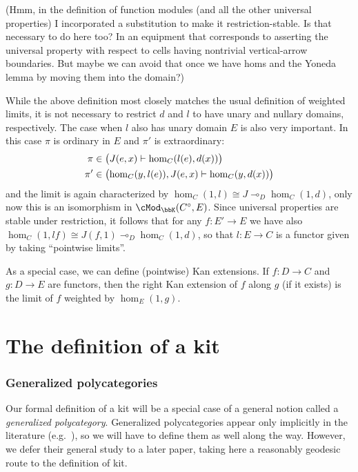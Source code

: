 \documentclass{amsart}
\newcommand{\K}{\bbK}
\let\mod\cMod
\def\modk{\mod_\K}
\def\mor#1{\hom_{#1}}
\renewcommand{\o}{^{\circ}}
\let\mto\vdash    %
\def\mhom#1#2{\left( #1 \vphantom{\big|}\mto #2 \right)}
\begin{document}
(Hmm, in the definition of function modules (and all the other universal properties) I incorporated a substitution to make it restriction-stable.  Is that necessary to do here too?  In an equipment that corresponds to asserting the universal property with respect to cells having nontrivial vertical-arrow boundaries.  But maybe we can avoid that once we have homs and the Yoneda lemma by moving them into the domain?)

While the above definition most closely matches the usual definition of weighted limits, it is not necessary to restrict $d$ and $l$ to have unary and nullary domains, respectively.
The case when $l$ also has unary domain $E$ is also very important.
In this case $\pi$ is ordinary in $E$ and $\pi'$ is extraordinary:
\begin{align*}
\pi &\in \mhom{J(e,x)}{\mor{C}(l(e),d(x))} \\
\pi' &\in \mhom{\mor{C}(y,l(e)),J(e,x)}{\mor{C}(y,d(x))}
\end{align*}
and the limit is again characterized by $\mor{C}(1,l) \cong J \multimap_D \mor{C}(1,d)$, only now this is an isomorphism in $\modk(C\o,E)$.
Since universal properties are stable under restriction, it follows that for any $f:E'\to E$ we have also $\mor{C}(1,l f) \cong J(f,1) \multimap_D \mor{C}(1,d)$, so that $l:E\to C$ is a functor given by taking ``pointwise limits''.

As a special case, we can define (pointwise) Kan extensions.
If $f:D\to C$ and $g:D\to E$ are functors, then the right Kan extension of $f$ along $g$ (if it exists) is the limit of $f$ weighted by $\mor{E}(1,g)$.

\part{The definition of a kit}
\label{part:def}

\section{Generalized polycategories}
\label{sec:genpoly}

Our formal definition of a kit will be a special case of a general notion called a \emph{generalized polycategory}.
Generalized polycategories appear only implicitly in the literature (e.g.~\cite{garner:polycats}), so we will have to define them as well along the way.
However, we defer their general study to a later paper, taking here a reasonably geodesic route to the definition of kit.
\end{document}

